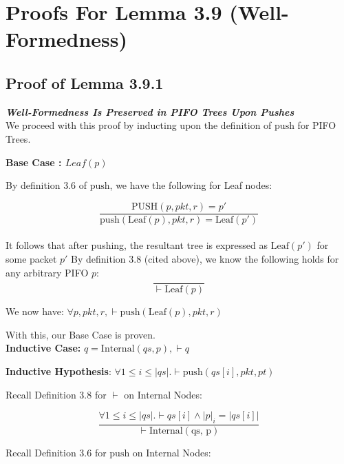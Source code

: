\documentclass{article}
\begin{document}
\section{Proofs For Lemma 3.9 (Well-Formedness)}

\subsection{Proof of Lemma 3.9.1}
\noindent \textit{\textbf{Well-Formedness Is Preserved in PIFO Trees Upon Pushes}}\\[10pt]

\noindent We proceed with this proof by inducting upon the definition of $\text{push}$ for PIFO Trees.\newline

\noindent \textbf{Base Case : $Leaf(p)$}\newline

\noindent By definition 3.6 of $\text{push}$, we have the following for Leaf nodes:

$$\frac{\text{PUSH}(p, pkt, r) = p'}{\text{push}(\text{Leaf}(p), pkt, r) = \text{Leaf}(p')}$$\\[-10pt]

\noindent It follows that after pushing, the resultant tree is expressed as $\text{Leaf}(p')$ for some packet $p'$ By definition 3.8 (cited above), we know the following holds for any arbitrary PIFO $p$:\\[-10pt]

$$\frac{}{\vdash \text{Leaf}(p)}$$

\noindent We now have: $\forall p, pkt, r, \vdash \text{push}(\text{Leaf}(p), pkt, r)$\newline

\noindent With this, our Base Case is proven.\\[10pt]

\noindent \textbf{Inductive Case:} $q = \text{Internal}(qs, p), \vdash q$\newline

\noindent \textbf{Inductive Hypothesis}: $\forall 1 \leq i \leq |qs|. \vdash \text{push}(qs[i], pkt, pt)$\newline

\noindent Recall Definition 3.8 for $\vdash$ on Internal Nodes:

$$\frac{\forall 1 \leq i \leq |qs|. \vdash qs[i] \land |p|_i = |qs[i]|}{\vdash \text{Internal}(\text{qs, p})}$$\newline

\noindent Recall Definition 3.6 for $\text{push}$ on Internal Nodes:
\end{document}
